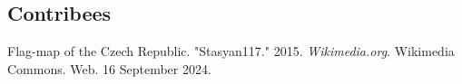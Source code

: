 \documentclass[12pt, oneside]{article}
\begin{document}
\subsection{Contribees}


%
%

\newpage

\begin{thebibliography}{e}
Flag-map of the Czech Republic. "Stasyan117." 2015. \textit{Wikimedia.org}. Wikimedia Commons. Web. 16 September 2024.


\end{thebibliography}
\end{document}
